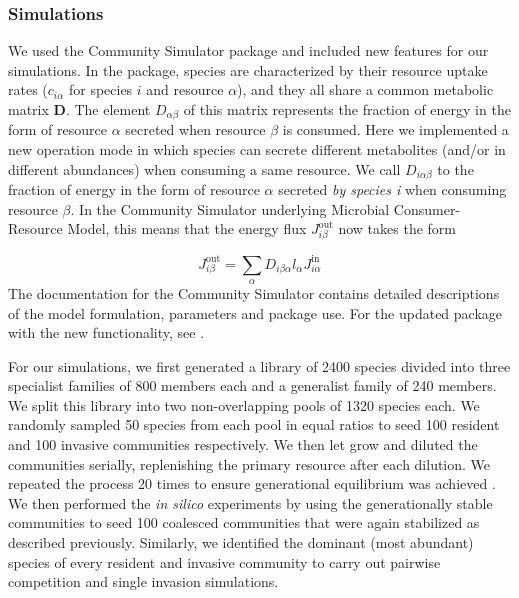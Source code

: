 \documentclass[a4paper,10pt]{article}
\begin{document}
\subsubsection*{Simulations}\label{methods:sim}

We used the Community Simulator package \cite{Marsland2020} and included new
features for our simulations. In the package,
species are characterized by their resource uptake rates ($c_{i\alpha}$ for
species $i$ and resource $\alpha$), and they all
share a common metabolic matrix $\mathbf{D}$.
The element $D_{\alpha\beta}$
of this matrix represents the fraction of energy in the form of resource $\alpha$
secreted when resource $\beta$ is consumed.
Here we implemented a new operation mode
in which species can secrete different metabolites (and/or
in different abundances) when consuming a same resource.
We call $D_{i\alpha\beta}$ to the
fraction of energy in the form of resource $\alpha$ secreted \textit{by species
i} when consuming resource $\beta$.
In the Community Simulator underlying Microbial Consumer-Resource Model,
this means that the energy flux 
$J^{\mathrm{out}}_{i\beta}$ \cite{Goldford2018,Marsland2019}
now takes the form

\begin{equation}
J^{\mathrm{out}}_{i\beta} = \sum_\alpha D_{i\beta\alpha} l_\alpha J^{\mathrm{in}}_{i\alpha}
\label{eq:jout}
\end{equation}
%
The documentation for the Community Simulator contains detailed
descriptions of the model formulation,
parameters and package use.
For the updated package with
the new functionality, see .

For our simulations,
we first generated a library of 2400 species divided into three specialist
families of 800 members each
and a generalist family of 240 members.
We split this library into two non-overlapping pools of 1320 species each.
We randomly sampled 50 species from each pool in equal ratios to seed
100 resident and
100 invasive communities respectively.
We then let grow and diluted the communities serially,
replenishing the primary
resource after each dilution.
We repeated the process 20 times to ensure generational equilibrium was
achieved \cite{Goldford2018}.
We then performed the \textit{in silico} experiments by using the
generationally stable communities to seed 100 coalesced communities
that were again stabilized as described previously.
Similarly, we identified the dominant (most
abundant) species of every resident and invasive community to carry out pairwise
competition and single invasion simulations.
\end{document}
